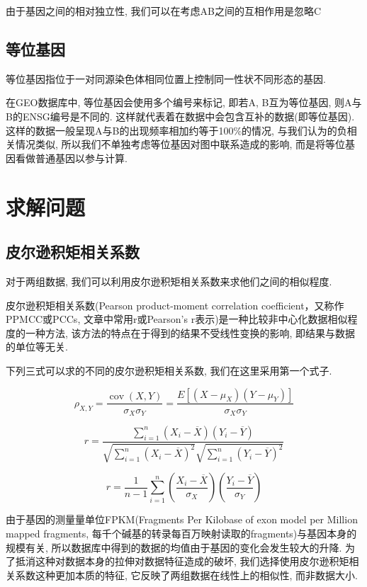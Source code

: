 \documentclass[zihao=-4]{ctexart}
\begin{document}
由于基因之间的相对独立性, 我们可以在考虑AB之间的互相作用是忽略C

\subsection{等位基因}
等位基因指位于一对同源染色体相同位置上控制同一性状不同形态的基因.

在GEO数据库中, 等位基因会使用多个编号来标记, 即若A, B互为等位基因, 则A与B的ENSG编号是不同的. 这样就代表着在数据中会包含互补的数据(即等位基因). 这样的数据一般呈现A与B的出现频率相加约等于100\%的情况, 与我们认为的负相关情况类似, 所以我们不单独考虑等位基因对图中联系造成的影响, 而是将等位基因看做普通基因以参与计算.

\section{求解问题}
\subsection{皮尔逊积矩相关系数}
对于两组数据, 我们可以利用皮尔逊积矩相关系数\cite{wiki:pierxun}来求他们之间的相似程度. 

皮尔逊积矩相关系数(Pearson product-moment correlation coefficient，又称作PPMCC或PCCs, 文章中常用r或Pearson's r表示)是一种比较非中心化数据相似程度的一种方法, 该方法的特点在于得到的结果不受线性变换的影响, 即结果与数据的单位等无关.

下列三式可以求的不同的皮尔逊积矩相关系数, 我们在这里采用第一个式子.

\begin{equation}
    \rho_{X, Y}=\frac{\operatorname{cov}(X, Y)}{\sigma_{X} \sigma_{Y}}=\frac{E\left[\left(X-\mu_{X}\right)\left(Y-\mu_{Y}\right)\right]}{\sigma_{X} \sigma_{Y}}
\end{equation}

\begin{equation*}
    r=\frac{\sum_{i=1}^{n}\left(X_{i}-\overline{X}\right)\left(Y_{i}-\overline{Y}\right)}{\sqrt{\sum_{i=1}^{n}\left(X_{i}-\overline{X}\right)^{2}} \sqrt{\sum_{i=1}^{n}\left(Y_{i}-\overline{Y}\right)^{2}}}
\end{equation*}

\begin{equation*}
    r=\frac{1}{n-1} \sum_{i=1}^{n}\left(\frac{X_{i}-\overline{X}}{\sigma_{X}}\right)\left(\frac{Y_{i}-\overline{Y}}{\sigma_{Y}}\right)
\end{equation*}

由于基因的测量量单位FPKM(Fragments Per Kilobase of exon model per Million mapped fragments, 每千个碱基的转录每百万映射读取的fragments)与基因本身的规模有关, 所以数据库中得到的数据的均值由于基因的变化会发生较大的升降. 为了抵消这种对数据本身的拉伸对数据特征造成的破坏, 我们选择使用皮尔逊积矩相关系数这种更加本质的特征, 它反映了两组数据在线性上的相似性, 而非数据大小. 
\end{document}
